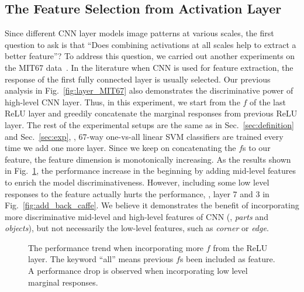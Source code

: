 \documentclass[10pt,twocolumn,letterpaper]{article}
\begin{document}
\subsection{The Feature Selection from Activation Layer}

Since different CNN layer models image patterns at various scales, the first question to ask is that ``Does combining activations at all scales help to extract a better feature''?  To address this question, we carried out another experiments on the MIT67 data~\cite{MIT67}. In the literature when CNN is used for feature extraction, the response of the first fully connected layer is usually selected. Our previous analysis in Fig.~\ref{fig:layer_MIT67} also demonstrates the discriminative power of high-level CNN layer. Thus, in this experiment, we start from the $f$ of the last ReLU layer and greedily concatenate the marginal responses from previous ReLU layer. The rest of the experimental setups are the same as in Sec.~\ref{sec:definition} and Sec.~\ref{sec:exp}, \ie, 67-way one-vs-all linear SVM classifiers are trained every time we add one more layer. Since we keep on concatenating the $f$s to our feature, the feature dimension is monotonically increasing. As the results shown in Fig.~\ref{fig:add_back}, the performance increase in the beginning by adding mid-level features to enrich the model discriminativeness. However, including some low level responses to the feature actually hurts the performance, \ie, layer 7 and 3 in Fig.~\ref{fig:add_back_caffe}. We believe it demonstrates the benefit of incorporating more discriminative mid-level and high-level features of CNN (\ie, \textit{parts} and \textit{objects}), but not necessarily the low-level features, such as \textit{corner} or \textit{edge}. 

\begin{figure}[htbp]
\centering
\caption{The performance trend when incorporating more $f$ from the ReLU layer. The keyword ``all'' means previous $f$s been included as feature. A performance drop is observed when incorporating low level marginal responses.}

\label{fig:add_back}
\end{figure}
\end{document}
